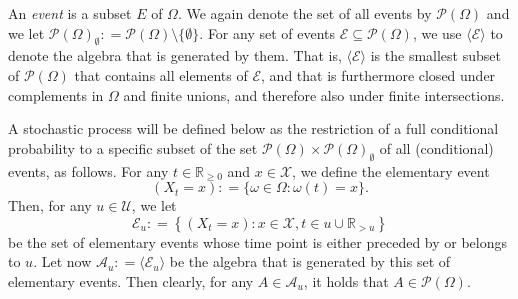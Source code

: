 \documentclass[10pt,a4paper]{paper}
\theoremstyle{definition}
\newcommand{\nats}{\mathbb{N}}
\newcommand{\reals}{\mathbb{R}}
\newcommand{\realsnonneg}{\reals_{\geq 0}}
\newcommand{\states}{\mathcal{X}}
\newcommand{\paths}{\Omega}
\newcommand{\power}{\mathcal{P}(\paths)}
\newcommand{\nonemptypower}{\power_{\emptyset}}
\newcommand{\events}{\mathcal{E}}
\newcommand{\filter}[1][t]{\mathcal{F}_{#1}}
\newcommand{\coloneqq}{:\!=}
\begin{document}
An \emph{event} is a subset $E$ of $\paths$. We again denote the set of all events by $\power$ and we let $\nonemptypower\coloneqq\power\setminus\{\emptyset\}$. For any set of events $\mathcal{E}\subseteq\power$, we use $\langle\mathcal{E}\rangle$ to denote the algebra that is generated by them. That is, $\langle\mathcal{E}\rangle$ is the smallest subset of $\power$ that contains all elements of $\mathcal{E}$, and that is furthermore closed under complements in $\Omega$ and finite unions, and therefore also under finite intersections. 

A stochastic process will be defined below as the restriction of a full conditional probability to a specific subset of the set $\power\times\nonemptypower$ of all (conditional) events, as follows. For any $t\in\realsnonneg$ and $x\in\states$, we define the elementary event
\begin{equation*}
(X_t=x)\coloneqq\{\omega\in\paths\colon\omega(t)=x\}.
\end{equation*}
%
%
Then, for any $u\in\mathcal{U}$, we let
\begin{equation*}
\mathcal{E}_u \coloneqq \left\{
(X_t=x)
\colon
x\in\states,t\in u\cup\reals_{>u}
\right\}
\end{equation*}
be the set of elementary events whose time point is either preceded by or belongs to $u$. Let now $\mathcal{A}_u\coloneqq\langle\mathcal{E}_u\rangle$ be the algebra that is generated by this set of elementary events. Then clearly, for any $A\in\mathcal{A}_u$, it holds that $A\in\power$.
\end{document}
